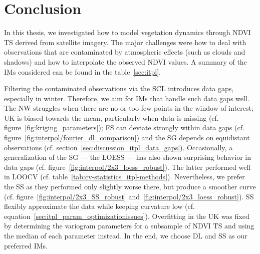 \chapter{Conclusion}
\label{sec:Conclusion}


    In this thesis, we investigated how to model vegetation dynamics through NDVI {TS} derived from satellite imagery. The major challenges were how to deal with observations that are contaminated by atmospheric effects (such as clouds and shadows) and how to interpolate the observed NDVI values. 
    A summary of the {{IM}}s considered can be found in the table~\ref{sec:itpl}. 
    
    Filtering the contaminated observations via the SCL introduces data gaps, especially in winter. Therefore, we aim for {{IM}}s that handle such data gaps well. The NW struggles when there are no or too few points in the window of interest; UK is biased towards the mean, particularly when data is missing (cf. figure~\ref{fig:kriging_parameters}); FS can deviate strongly within data gaps (cf. figure~\ref{fig:interpol/fourier_dl_comparison}) and the SG depends on equidistant observations (cf. section~\ref{sec:discussion_itpl_data_gaps}). Occasionally, a generalization of the SG --- the LOESS --- has also shown surprising behavior in data gaps (cf. figure~\ref{fig:interpol/2x3_loess_robust}).
    The latter performed well in LOOCV (cf. table~\ref{tab:cv-statistics_itpl-methods}). Nevertheless, we prefer the SS as they performed only slightly worse there, but produce a smoother curve (cf. figure~\ref{fig:interpol/2x3_SS_robust} and~\ref{fig:interpol/2x3_loess_robust}). SS flexibly approximate the data while keeping curvature low (cf. equation~\ref{sec:itpl_param_optimizationissues}). Overfitting in the UK was fixed by determining the variogram parameters for a subsample of NDVI {TS} and using the median of each parameter instead. 
    In the end, we choose DL and SS as our preferred {{IM}}s.




